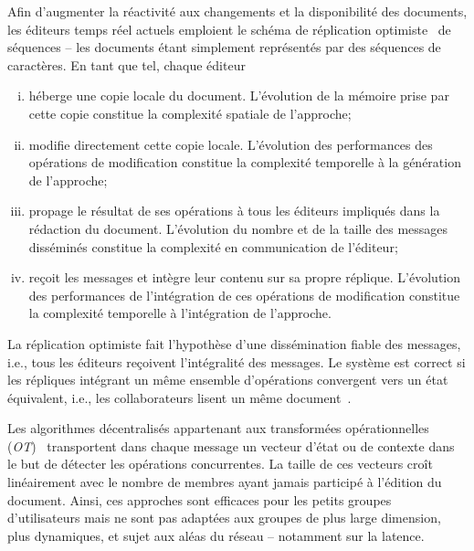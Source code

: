 Afin d'augmenter la réactivité aux changements et la disponibilité des
documents, les éditeurs temps réel actuels emploient le schéma de réplication
optimiste~\cite{demers1987epidemic, ladin1992providing, saito2005optimistic,
sun1998achieving} de séquences -- les documents étant simplement représentés par
des séquences de caractères. En tant que tel, chaque éditeur
\begin{enumerate}[(i)] 
\item héberge une copie locale du document. L'évolution de la mémoire prise par
cette copie constitue la complexité spatiale de l'approche;

\item modifie directement cette copie locale. L'évolution des performances des
 opérations de modification constitue la complexité temporelle à la génération
 de l'approche;

\item propage le résultat de ses opérations à tous les éditeurs impliqués dans
la rédaction du document. L'évolution du nombre et de la taille des messages
disséminés constitue la complexité en communication de l'éditeur;

\item reçoit les messages et intègre leur contenu sur sa propre
réplique. L'évolution des performances de l'intégration de ces opérations de
modification constitue la complexité temporelle à l'intégration de l'approche.
\end{enumerate}

\noindent La réplication optimiste fait l'hypothèse d'une dissémination fiable
des messages, i.e., tous les éditeurs reçoivent l'intégralité des messages. Le
système est correct si les répliques intégrant un même ensemble d'opérations
convergent vers un état équivalent, i.e., les collaborateurs lisent un même
document~\cite{bailis2013eventual, shapiro2011conflict}.

Les algorithmes décentralisés appartenant aux transformées opérationnelles
(\emph{OT})~\cite{sun1998operational, sun2009contextbased} transportent dans
chaque message un vecteur d'état ou de contexte dans le but de détecter les
opérations concurrentes. La taille de ces vecteurs croît linéairement avec le
nombre de membres ayant jamais participé à l'édition du document. Ainsi, ces
approches sont efficaces pour les petits groupes d'utilisateurs mais ne sont pas
adaptées aux groupes de plus large dimension, plus dynamiques, et sujet aux
aléas du réseau -- notamment sur la latence.

